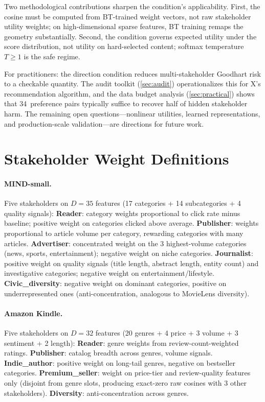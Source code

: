 \documentclass[11pt,letterpaper]{article}
\begin{document}
Two methodological contributions sharpen the condition's
applicability. First, the cosine must be computed from BT-trained
weight vectors, not raw stakeholder utility weights; on
high-dimensional sparse features, BT training remaps the geometry
substantially. Second, the condition governs expected utility under
the score distribution, not utility on hard-selected content;
softmax temperature $T \geq 1$ is the safe regime.

For practitioners: the direction condition reduces multi-stakeholder
Goodhart risk to a checkable quantity. The audit toolkit
(\cref{sec:audit}) operationalizes this for X's recommendation
algorithm, and the data budget analysis (\cref{sec:practical}) shows
that 34~preference pairs typically suffice to recover half of hidden
stakeholder harm. The remaining open questions---nonlinear utilities,
learned representations, and production-scale validation---are
directions for future work.




\appendix

\section{Stakeholder Weight Definitions}
\label{app:stakeholders}

\paragraph{MIND-small.} Five stakeholders on $D = 35$ features
(17 categories + 14 subcategories + 4 quality signals):
\textbf{Reader}: category weights proportional to click rate minus
baseline; positive weight on categories clicked above average.
\textbf{Publisher}: weights proportional to article volume per
category, rewarding categories with many articles.
\textbf{Advertiser}: concentrated weight on the 3 highest-volume
categories (news, sports, entertainment); negative weight on niche
categories.
\textbf{Journalist}: positive weight on quality signals (title
length, abstract length, entity count) and investigative categories;
negative weight on entertainment/lifestyle.
\textbf{Civic\_diversity}: negative weight on dominant categories,
positive on underrepresented ones (anti-concentration, analogous to
MovieLens diversity).

\paragraph{Amazon Kindle.} Five stakeholders on $D = 32$ features
(20 genres + 4 price + 3 volume + 3 sentiment + 2 length):
\textbf{Reader}: genre weights from review-count-weighted ratings.
\textbf{Publisher}: catalog breadth across genres, volume signals.
\textbf{Indie\_author}: positive weight on long-tail genres,
negative on bestseller categories.
\textbf{Premium\_seller}: weight on price-tier and review-quality
features only (disjoint from genre slots, producing exact-zero raw
cosines with 3 other stakeholders).
\textbf{Diversity}: anti-concentration across genres.
\end{document}
